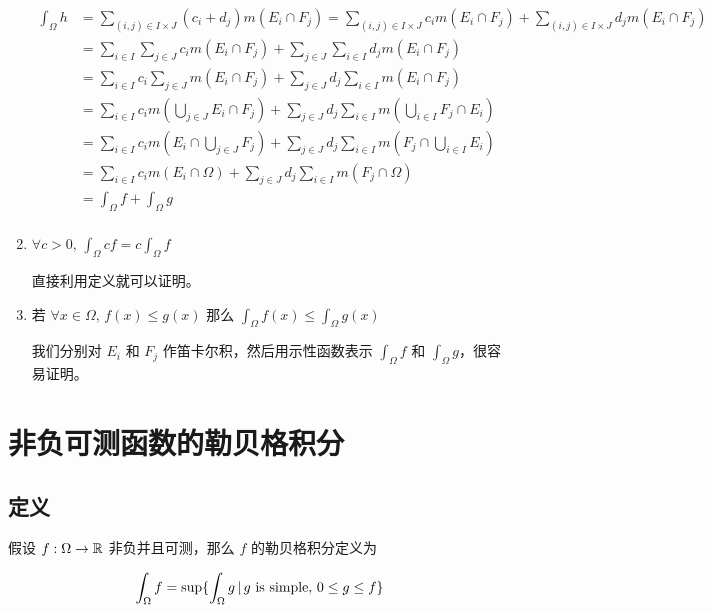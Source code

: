 \begin{enumerate}
    \begin{align*}
        \int_{\Omega}h &= \sum_{(i,j) \in I \times J}(c_i + d_j) m(E_i \cap F_j) =\sum_{(i,j) \in I \times J}c_i m(E_i \cap F_j) + \sum_{(i,j) \in I \times J}d_j m(E_i \cap F_j) \\
            & = \sum_{i \in I} \sum_{j \in J}c_im(E_i \cap F_j) + \sum_{j \in J} \sum_{i \in I}d_jm(E_i \cap F_j)  \\
            & = \sum_{i \in I} c_i\sum_{j \in J}m(E_i \cap F_j) + \sum_{j \in J} d_j \sum_{i \in I}m(E_i \cap F_j)  \\
            & = \sum_{i \in I} c_i m(\bigcup_{j \in J}E_i \cap F_j) + \sum_{j \in J} d_j \sum_{i \in I}m(\bigcup_{i \in I}F_j \cap E_i) \\  
            & = \sum_{i \in I} c_i m(E_i \cap \bigcup_{j \in J} F_j) + \sum_{j \in J} d_j \sum_{i \in I}m(F_j \cap \bigcup_{i \in I}E_i) \\  
            & = \sum_{i \in I} c_i m(E_i \cap \Omega) + \sum_{j \in J} d_j \sum_{i \in I}m(F_j \cap \Omega) \\  
            & = \int_{\Omega} f + \int_{\Omega}g \\  
    \end{align*}

    \item $\forall c >0,\, \int_{\Omega}cf = c\int_{\Omega}f$

    直接利用定义就可以证明。

    \item 若 $\forall x \in \Omega,\, f(x) \le g(x)$ 那么 $\int_{\Omega}f(x) \le \int_{\Omega}g(x)$

    我们分别对 $E_i$ 和 $F_j$ 作笛卡尔积，然后用示性函数表示 $\int_{\Omega}f$ 和 $\int_{\Omega}g$，很容易证明。


\end{enumerate}

\section{非负可测函数的勒贝格积分}

\subsection{定义}

假设 $f: \Omega \to \mathbb{R}$ 非负并且可测，那么 $f$ 的勒贝格积分定义为

\[
\int_{\Omega}f = \sup \{ \int_{\Omega}g \,\vert\, g \text{ is simple},\, 0 \le g \le f \}
\]

